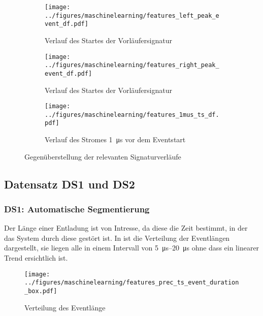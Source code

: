 \begin{figure}[H]
    \centering
    \begin{subfigure}[b]{0.32\linewidth}
        \texttt{[image: ../figures/maschinelearning/features\_left\_peak\_event\_df.pdf]}
        \caption{Verlauf des Startes der Vorläufersignatur}
        \label{fig:event_left_current_sliece}
    \end{subfigure}
    \hfill
    \begin{subfigure}[b]{0.32\linewidth}
        \texttt{[image: ../figures/maschinelearning/features\_right\_peak\_event\_df.pdf]}
        \caption{Verlauf des Startes der Vorläufersignatur}
        \label{fig:event-right-current_sliece}
    \end{subfigure}
    \hfill
    \begin{subfigure}[b]{0.32\linewidth}
        \texttt{[image: ../figures/maschinelearning/features\_1mus\_ts\_df.pdf]}
        \caption{Verlauf des Stromes \SI{1}{\micro\second} vor dem Eventstart}
        \label{fig:1mus-current-sliece}
    \end{subfigure}
    \caption{Gegenüberstellung der relevanten Signaturverläufe}
    \label{fig:all-event-slices}
\end{figure}

\subsection{Datensatz DS1 und DS2}

\subsubsection{DS1: Automatische Segmentierung}
Der Länge einer Entladung ist von Intresse, da diese die Zeit bestimmt, in der das System durch diese gestört ist. In  ist die Verteilung der Eventlängen dargestellt, sie liegen alle in einem Intervall von \SIrange{5}{20}{\micro\second} ohne dass ein linearer Trend ersichtlich ist.

\begin{figure}[H]
    \centering
      \texttt{[image: ../figures/maschinelearning/features\_prec\_ts\_event\_duration\_box.pdf]}
      \caption{Verteilung des Eventlänge}
      \label{fig:prec_ts_event_duration_box}
\end{figure}

\begin{table}[h!]
\centering
\caption{Model Performance für die Vorhersage der Eventlänge}
\end{table}



